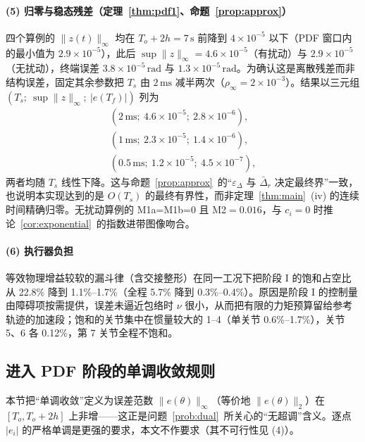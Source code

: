 \paragraph{(5) 归零与稳态残差（定理~\ref{thm:pdf1}、命题~\ref{prop:approx}）}
四个算例的 \(\lVert z(t)\rVert_\infty\) 均在 \(T_o+2h=7\,\mathrm{s}\) 前降到 \(4\times10^{-5}\) 以下（PDF 窗口内的最小值为 \(2.9\times10^{-5}\)），此后 \(\sup\lVert z\rVert_\infty=4.6\times10^{-5}\)（有扰动）与 \(2.9\times10^{-5}\)（无扰动），终端误差 \(3.8\times10^{-5}\,\mathrm{rad}\) 与 \(1.3\times10^{-5}\,\mathrm{rad}\)。为确认这是离散残差而非结构误差，固定其余参数把 \(T_s\) 由 \(2\,\mathrm{ms}\) 减半两次（\(\rho_\infty=2\times10^{-3}\)）。结果以三元组 \((T_s;\ \sup\lVert z\rVert_\infty;\ \lvert e(T_f)\rvert)\) 列为
\[
\begin{gathered}
(2\,\mathrm{ms};\ 4.6\times10^{-5};\ 2.8\times10^{-6}),\\
(1\,\mathrm{ms};\ 2.3\times10^{-5};\ 1.4\times10^{-6}),\\
(0.5\,\mathrm{ms};\ 1.2\times10^{-5};\ 4.5\times10^{-7}),
\end{gathered}
\]
两者均随 \(T_s\) 线性下降。这与命题~\ref{prop:approx}~的“\(\varepsilon_\Delta\) 与 \(\bar\Delta_r\) 决定最终界”一致，也说明本实现达到的是 \(O(T_s)\) 的最终有界性，而非定理~\ref{thm:main}~(iv) 的连续时间精确归零。无扰动算例的 M1a=M1b=0 且 M2\(=0.016\)，与 \(c_i=0\) 时推论~\ref{cor:exponential}~的指数进带图像吻合。

\paragraph{(6) 执行器负担}
等效物理增益较软的漏斗律（含交接整形）在同一工况下把阶段 I 的饱和占空比从 22.8\% 降到 1.1\%--1.7\%（全程 5.7\% 降到 0.3\%--0.4\%）。原因是阶段 I 的控制量由障碍项按需提供，误差未逼近包络时 \(\nu\) 很小，从而把有限的力矩预算留给参考轨迹的加速段；饱和的关节集中在惯量较大的 1--4（单关节 0.6\%--1.7\%），关节 5、6 各 0.12\%，第 7 关节全程不饱和。

\subsection{进入 PDF 阶段的单调收敛规则}
\label{sec:sim_mono}

本节把“单调收敛”定义为误差范数 \(\lVert e(\theta)\rVert_\infty\)（等价地 \(\lVert e(\theta)\rVert_2\)）在 \([T_o,T_o+2h]\) 上非增——这正是问题~\ref{prob:dual}~所关心的“无超调”含义。逐点 \(\lvert e_i\rvert\) 的严格单调是更强的要求，本文不作要求（其不可行性见 (4)）。

